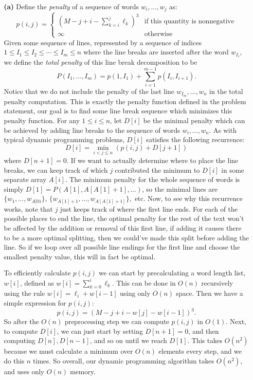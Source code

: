 \documentclass[11pt,letterpaper]{article}
\begin{document}
\begin{solution}
    \textbf{(a)} Define the \emph{penalty} of a sequence of words $w_i,\ldots,w_j$ as:
    \[
        p(i,j)=\begin{cases}
            \left(M-j+i-\sum^j_{k=i}\ell_k\right)^3&\textrm{if this quantity is nonnegative}\\
            \infty &\textrm{otherwise}
        \end{cases}
    \]  
    Given some sequence of lines, represented by a sequence of indices $1\leq I_1\leq I_2 \leq \cdots \leq I_m\leq n$ where the line breaks are inserted after the word $w_{I_i}$, we define the \emph{total penalty} of this line break decomposition to be 
    \[
        P(I_1, \ldots, I_m) = p(1, I_1)+\sum^{m-1}_{i=1}p(I_i, I_{i+1})
    .\] 
    Notice that we do not include the penalty of the last line $w_{I_m},\ldots,w_n$ in the total penalty computation. This is exactly the penalty function defined in the problem statement, our goal is to find some line break sequence which minimizes this penalty function. For any $1\leq i \leq n$, let $D[i]$ be the minimal penalty which can be achieved by adding line breaks to the sequence of words $w_i, \ldots, w_n$. As with typical dynamic programming problems, $D[i]$ satisfies the following recurrence:
    \[
        D[i]=\min_{i<j\leq n}\left(p(i,j)+D[j+1]\right)
    \]
    where $D[n+1]=0$. If we want to actually determine where to place the line breaks, we can keep track of which $j$ contributed the minimum to $D[i]$ in some separate array $A[i]$. The minimum penalty for the whole sequence of words is simply $D[1]=P(A[1], A[A[1]+1], \ldots)$, so the minimal lines are $\{w_1,\ldots,w_{A[01}\}$, $\{w_{A[1]+1},\ldots,w_{A[A[1]+1]}\},$ etc. Now, to see why this recurrence works, note that $j$ just keeps track of where the first line ends. For each of the possible places to end the line, the optimal penalty for the rest of the text won't be affected by the addition or removal of this first line, if adding it causes there to be a more optimal splitting, then we could've made this split before adding the line. So if we loop over all possible line endings for the first line and choose the smallest penalty value, this will in fact be optimal. 
    
    To efficiently calculate $p(i,j)$ we can start by precalculating a word length list, $w[i]$, defined as $w[i]=\sum^i_{k=0}\ell_k$. This can be done in $O(n)$ recursively using the rule $w[i]=\ell_i+w[i-1]$ using only $O(n)$ space. Then we have a simple expression for $p(i,j)$: \[p(i,j)=(M-j+i-w[j]-w[i-1])^3.\] So after the $O(n)$ preprocessing step we can compute $p(i,j)$ in $O(1)$. Next, to compute $D[i]$, we can just start by setting $D[n+1]=0$, and then computing $D[n], D[n-1]$, and so on until we reach $D[1]$. This takes $O(n^2)$ because we must calculate a minimum over $O(n)$ elements every step, and we do this $n$ times. So overall, our dynamic programming algorithm takes $O(n^2)$, and uses only $O(n)$ memory.
    

\end{solution}
\end{document}
